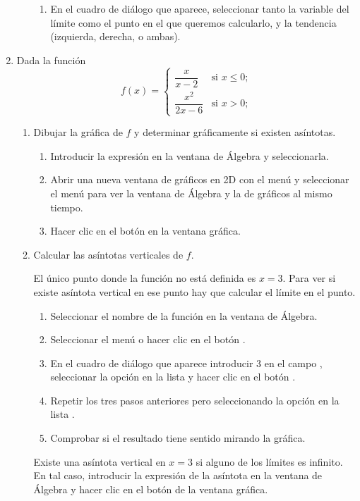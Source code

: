 \begin{enumerate}[leftmargin=*]
\begin{enumerate}
\begin{indicacion}
\begin{enumerate}
\item En el cuadro de diálogo que aparece, seleccionar tanto la variable del límite como el punto en el que queremos calcularlo, y la
tendencia (izquierda, derecha, o ambas).
\end{enumerate}
\end{indicacion}
\end{enumerate}


\item Dada la función 
\[
f(x)=
\begin{cases}
\dfrac{x}{x-2} & \mbox{si $x\leq 0$;}\\
\dfrac{x^2}{2x-6} & \mbox{si $x>0$;}
\end{cases}
\]
\begin{enumerate}
\item Dibujar la gráfica de $f$ y determinar gráficamente si existen asíntotas.
\begin{indicacion}
\begin{enumerate}
\item Introducir la expresión  en la ventana de Álgebra y seleccionarla.
\item Abrir una nueva ventana de gráficos en 2D con el menú  y seleccionar el menú  para ver la ventana de Álgebra y la de gráficos al mismo tiempo.  
\item Hacer clic en el botón  en la ventana gráfica.
\end{enumerate}
\end{indicacion}

\item Calcular las asíntotas verticales de $f$.
\begin{indicacion}
El único punto donde la función no está definida es $x=3$.
Para ver si existe asíntota vertical en ese punto hay que calcular el límite en el punto.
\begin{enumerate}
\item Seleccionar el nombre de la función en la ventana de Álgebra.
\item Seleccionar el menú  o hacer clic en el botón .
\item En el cuadro de diálogo que aparece introducir 3 en el campo , seleccionar la opción  en la lista  y hacer clic en el botón . 
\item Repetir los tres pasos anteriores pero seleccionando la opción  en la lista .
\item Comprobar si el resultado tiene sentido mirando la gráfica.
\end{enumerate}
Existe una asíntota vertical en $x=3$ si alguno de los límites es infinito.
En tal caso, introducir la expresión de la asíntota en la ventana de Álgebra y hacer clic en el botón  de la ventana gráfica.
\end{indicacion}


\end{enumerate}
\end{enumerate}
